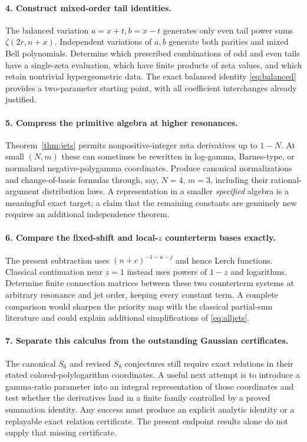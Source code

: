 \paragraph{4. Construct mixed-order tail identities.}
The balanced variation $a=x+t,b=x-t$ generates only even tail power sums
$\zeta(2r,n+x)$.  Independent variations of $a,b$ generate both parities
and mixed Bell polynomials.  Determine which prescribed combinations of
odd and even tails have a single-zeta evaluation, which have finite
products of zeta values, and which retain nontrivial hypergeometric data.
The exact balanced identity \eqref{eq:balanced} provides a two-parameter
starting point, with all coefficient interchanges already justified.

\paragraph{5. Compress the primitive algebra at higher resonances.}
Theorem~\ref{thm:jets} permits nonpositive-integer zeta derivatives up to
$1-N$.  At small $(N,m)$ these can sometimes be rewritten in log-gamma,
Barnes-type, or normalized negative-polygamma coordinates.  Produce
canonical normalizations and change-of-basis formulas through, say,
$N=4$, $m=3$, including their rational-argument distribution laws.
A representation in a smaller \emph{specified} algebra is a meaningful
exact target; a claim that the remaining constants are genuinely new
requires an additional independence theorem.

\paragraph{6. Compare the fixed-shift and local-$z$ counterterm bases exactly.}
The present subtraction uses $(n+c)^{-1-u-j}$ and hence Lerch functions.
Classical continuation near $z=1$ instead uses powers of $1-z$ and
logarithms.  Determine finite connection matrices between these two
counterterm systems at arbitrary resonance and jet order, keeping every
constant term.  A complete comparison would sharpen the priority map
with the classical partial-sum literature and could explain additional
simplifications of \eqref{eq:alljets}.

\paragraph{7. Separate this calculus from the outstanding Gaussian certificates.}
The canonical $S_6$ and revised $S_8$ conjectures still require exact
relations in their stated colored-polylogarithm coordinates.  A useful
next attempt is to introduce a gamma-ratio parameter into an integral
representation of those coordinates and test whether the derivatives
land in a finite family controlled by a proved summation identity.
Any success must produce an explicit analytic identity or a replayable
exact relation certificate.  The present endpoint results alone do not
supply that missing certificate.


